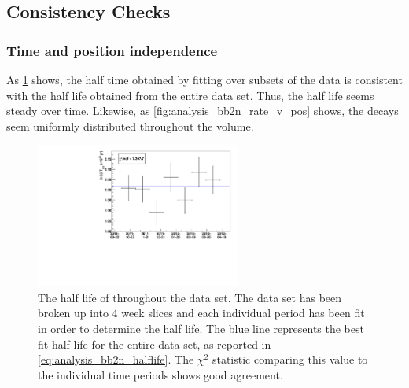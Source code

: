 \documentclass[herrin-thesis.tex]{subfiles}
\begin{document}
\subsection{Consistency Checks}
\subsubsection{Time and position independence}
As \cref{fig:analysis_bb2n_rate_v_time} shows, the half time obtained by fitting over subsets of the data is consistent with the half life obtained from the entire data set. Thus, the half life seems steady over time. Likewise, as \cref{fig:analysis_bb2n_rate_v_pos} shows, the \twonu{} decays seem uniformly distributed throughout the volume.

\begin{figure}[htb]
\centering
\includegraphics[width=0.6\textwidth]{./plots/analysis_bb2n_rate_v_time.pdf}
\caption[\twonu half life v. time]{The half life of \twonu throughout the data set. The data set has been broken up into 4 week slices and each individual period has been fit in order to determine the half life. The blue line represents the best fit half life for the entire data set, as reported in \cref{eq:analysis_bb2n_halflife}. The \(\chi^2\) statistic comparing this value to the individual time periods shows good agreement.}
\label{fig:analysis_bb2n_rate_v_time}
\end{figure}
\end{document}
